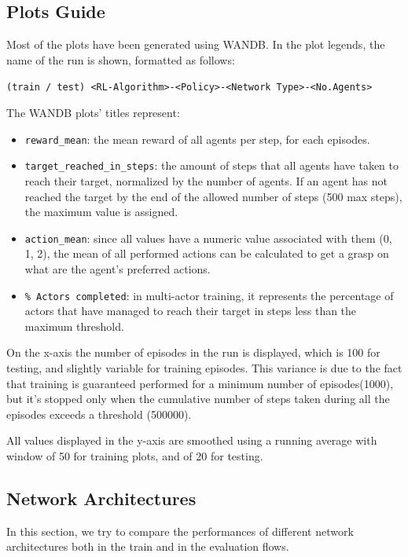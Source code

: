 \documentclass[13pt]{article}
\begin{document}

\subsection*{Plots Guide}
Most of the plots have been generated using WANDB. In the plot legends, the name of the run is shown, formatted as follows:
\begin{center}
    \texttt{(train / test) <RL-Algorithm>-<Policy>-<Network Type>-<No.Agents>}
\end{center}

The WANDB plots' titles represent:
\begin{itemize}
    \item \texttt{reward\_mean}: the mean reward of all agents per step, for each episodes.
    \item \texttt{target\_reached\_in\_steps}: the amount of steps that all agents have taken to reach their target, normalized by the number of agents. If an agent has not reached the target by the end of the allowed number of steps (500 max steps), the maximum value is assigned.
    \item \texttt{action\_mean}: since all values have a numeric value associated with them (0, 1, 2), the mean of all performed actions can be calculated to get a grasp on what are the agent's preferred actions.
    \item \texttt{\% Actors completed}: in multi-actor training, it represents the percentage of actors that have managed to reach their target in steps less than the maximum threshold.
\end{itemize}

On the x-axis the number of episodes in the run is displayed, which is 100 for testing, and slightly variable for training episodes. This variance is due to the fact that training is guaranteed performed for a minimum number of episodes(1000), but it's stopped only when the cumulative number of steps taken during all the episodes exceeds a threshold (500000).

All values displayed in the y-axis are smoothed using a running average with window of 50 for training plots, and of 20 for testing.


\subsection{Network Architectures}
In this section, we try to compare the performances of different network architectures both in the train and in the evaluation flows.
\end{document}

